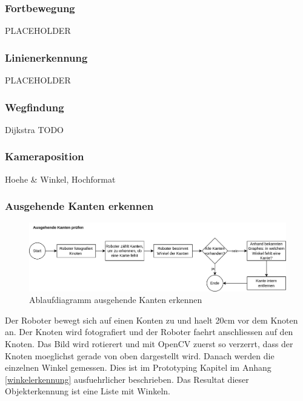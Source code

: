 \subsubsection{Fortbewegung}

PLACEHOLDER

\subsubsection{Linienerkennung}

PLACEHOLDER

\subsubsection{Wegfindung}

Dijkstra TODO

\subsubsection{Kameraposition}

Hoehe \& Winkel, Hochformat

\subsubsection{Ausgehende Kanten erkennen}

\begin{figure}[H]
\centering
\includegraphics[width=\textwidth]{assets/gesamtkonzept/ablaufdiagramm-kanten-erkennen.png}
\caption{Ablaufdiagramm ausgehende Kanten erkennen}
\label{fig:ablaufdiagramm-kanten-erkennen}
\end{figure}

Der Roboter bewegt sich auf einen Konten zu und haelt 20cm vor dem Knoten an. Der Knoten wird fotografiert und der Roboter faehrt anschliessen auf den Knoten. Das Bild wird rotierert und mit OpenCV zuerst so verzerrt, dass der Knoten moeglichst gerade von oben dargestellt wird. Danach werden die einzelnen Winkel gemessen. Dies ist im Prototyping Kapitel im Anhang \ref{winkelerkennung} ausfuehrlicher beschrieben. Das Resultat dieser Objekterkennung ist eine Liste mit Winkeln.

